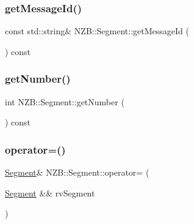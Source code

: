 \hypertarget{class_n_z_b_1_1_segment_a32fa4a2626200ab8760bf3c535174b63}{}\label{class_n_z_b_1_1_segment_a32fa4a2626200ab8760bf3c535174b63} 
\subsubsection{\texorpdfstring{get\+Message\+Id()}{getMessageId()}\hspace{0.1cm}{\footnotesize\ttfamily [2/2]}}
{\footnotesize\ttfamily const std\+::string\& N\+Z\+B\+::\+Segment\+::get\+Message\+Id (\begin{DoxyParamCaption}{ }\end{DoxyParamCaption}) const\hspace{0.3cm}{\ttfamily [inline]}}

\hypertarget{class_n_z_b_1_1_segment_a84476105a8639992e383a784fa7bbaf7}{}\label{class_n_z_b_1_1_segment_a84476105a8639992e383a784fa7bbaf7} 
\subsubsection{\texorpdfstring{get\+Number()}{getNumber()}}
{\footnotesize\ttfamily int N\+Z\+B\+::\+Segment\+::get\+Number (\begin{DoxyParamCaption}{ }\end{DoxyParamCaption}) const\hspace{0.3cm}{\ttfamily [inline]}}

\hypertarget{class_n_z_b_1_1_segment_a233a84cbcb935bbdcbcc517f36ddd5cc}{}\label{class_n_z_b_1_1_segment_a233a84cbcb935bbdcbcc517f36ddd5cc} 
\subsubsection{\texorpdfstring{operator=()}{operator=()}\hspace{0.1cm}{\footnotesize\ttfamily [1/2]}}
{\footnotesize\ttfamily \hyperlink{class_n_z_b_1_1_segment}{Segment}\& N\+Z\+B\+::\+Segment\+::operator= (\begin{DoxyParamCaption}\item[{\hyperlink{class_n_z_b_1_1_segment}{Segment} \&\&}]{rv\+Segment }\end{DoxyParamCaption})\hspace{0.3cm}{\ttfamily [default]}}

